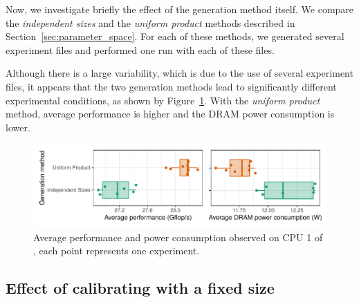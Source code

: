             Now, we investigate briefly the effect of the generation method itself. We compare the \emph{independent
            sizes} and the \emph{uniform product} methods described in Section~\ref{sec:parameter_space}. For each of
            these methods, we generated several experiment files and performed one run with each of these files.

            Although there is a large variability, which is due to the use of several experiment files, it appears that
            the two generation methods lead to significantly different experimental conditions, as shown by
            Figure~\ref{fig:randomizing_sizes:expfile:method}. With the \emph{uniform product} method, \dgemm average
            performance is higher and the DRAM power consumption is lower.

            \begin{figure}[htpb]
                \centering
                \includegraphics[width=\linewidth]{img/experiment/randomizing_sizes/method/average.pdf}
                \caption{Average \dgemm performance and power consumption observed on CPU 1 of \dahu[5], each point
                represents one experiment.}%
                \label{fig:randomizing_sizes:expfile:method}
            \end{figure}


        \subsection{Effect of calibrating with a fixed size}%
        \label{sub:fixed_size}

